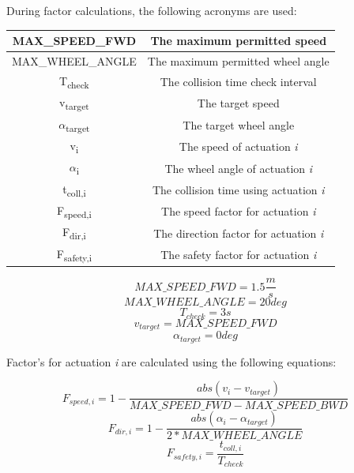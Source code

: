 \begin{minipage}{\textwidth}
During factor calculations, the following acronyms are used:

\begin{center}
    \begin{tabular}{ | c | c | }
        \hline
        MAX\_SPEED\_FWD					& The maximum permitted speed 						\\
        \hline
        MAX\_WHEEL\_ANGLE				& The maximum permitted wheel angle 				\\
        \hline
        T\textsubscript{check}  		& The collision time check interval      			\\
        \hline
        v\textsubscript{target}			& The target speed 									\\
        \hline
        $\alpha$\textsubscript{target}  & The target wheel angle      						\\
        \hline
        v\textsubscript{i}  			& The speed of actuation \textit{i}					\\
        \hline
        $\alpha$\textsubscript{i}  		& The wheel angle of actuation \textit{i}			\\
        \hline
        t\textsubscript{coll,i}  		& The collision time using actuation \textit{i}		\\
        \hline
        F\textsubscript{speed,i}  		& The speed factor for actuation \textit{i}			\\
        \hline
        F\textsubscript{dir,i}  		& The direction factor for actuation \textit{i}		\\
        \hline
        F\textsubscript{safety,i}  		& The safety factor for actuation \textit{i}		\\
        \hline
    \end{tabular}
\end{center}
\end{minipage}

\begin{minipage}{\textwidth}
\[ MAX\_SPEED\_FWD = 1.5 \frac{m}{s} \]
\[ MAX\_WHEEL\_ANGLE = 20 deg \]
\[ T_{check} = 3 s \]
\[ v_{target} = MAX\_SPEED\_FWD \]
\[ \alpha_{target} = 0 deg \]
\end{minipage}

\begin{minipage}{\textwidth}
Factor's for actuation \textit{i} are calculated using the following equations:

\[ F_{speed,i} = 1 - \frac{abs(v_{i} - v_{target})}{MAX\_SPEED\_FWD - MAX\_SPEED\_BWD} \]
\[ F_{dir,i} = 1 - \frac{abs(\alpha_{i} - \alpha_{target})}{2 * MAX\_WHEEL\_ANGLE} \]
\[ F_{safety,i} = \frac{t_{coll,i}}{T_{check}} \]
\end{minipage}

